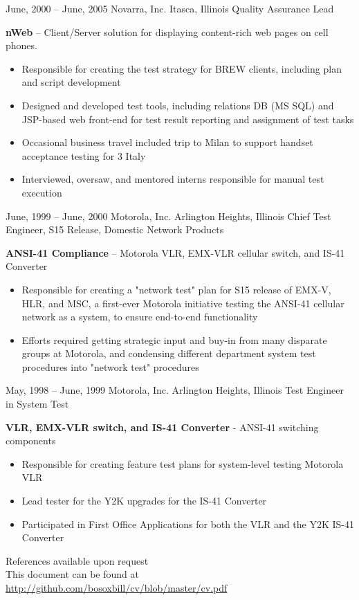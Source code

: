 \documentclass[]{friggeri-cv}
\begin{document}
\begin{entrylist}
     \entryalt
    {June, 2000 -- June, 2005}
    {Novarra, Inc.}
    {Itasca, Illinois}
    {Quality Assurance Lead}
    {\textbf{nWeb} -- Client/Server solution for displaying content-rich web pages on cell phones.
    \begin{itemize}
      \item Responsible for creating the test strategy for BREW clients, including plan and script development
      \item Designed and developed test tools, including relations DB (MS SQL) and JSP-based web front-end for test result reporting and assignment of test tasks
      \item Occasional business travel included trip to Milan to support handset acceptance testing for 3 Italy
      \item Interviewed, oversaw, and mentored interns responsible for manual test execution
     \end{itemize}}
     
     \entryalt
     {June, 1999 -- June, 2000}
     {Motorola, Inc.}
     {Arlington Heights, Illinois}
     {Chief Test Engineer, S15 Release, Domestic Network Products}
     {\textbf{ANSI-41 Compliance} -- Motorola VLR, EMX-VLR cellular switch, and IS-41 Converter
     \begin{itemize}
       \item Responsible for creating a "network test" plan for S15 release of EMX-V, HLR, and MSC, a first-ever Motorola initiative testing the ANSI-41 cellular network as a system, to ensure end-to-end functionality
       \item Efforts required getting strategic input and buy-in from many disparate groups at Motorola, and condensing different department system test procedures into "network test" procedures
     \end{itemize}}
       
     \entryalt
     {May, 1998 -- June, 1999}
     {Motorola, Inc.}
     {Arlington Heights, Illinois}
     {Test Engineer in System Test}
     {\textbf{VLR, EMX-VLR switch, and IS-41 Converter} - ANSI-41 switching components
     \begin{itemize}
       \item Responsible for creating feature test plans for system-level testing Motorola VLR
       \item Lead tester for the Y2K upgrades for the IS-41 Converter
       \item Participated in First Office Applications for both the VLR and the Y2K IS-41 Converter
     \end{itemize}}
     
\end{entrylist} 
    
References available upon request\\
This document can be found at \href{http://github.com/bosoxbill/cv/blob/master/cv.pdf}{http://github.com/bosoxbill/cv/blob/master/cv.pdf}
\end{document}
